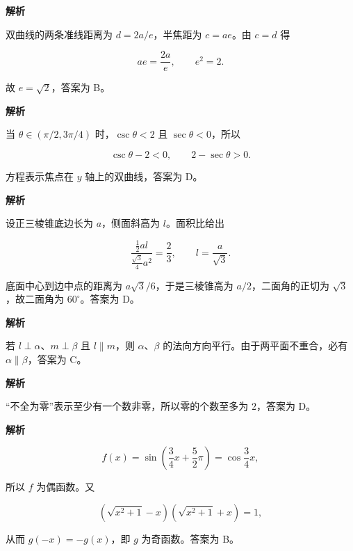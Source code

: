 \begin{answer}
\textbf{解析}

双曲线的两条准线距离为 $d=2a/e$，半焦距为 $c=ae$。由 $c=d$ 得

\nopagebreak[4]
\[
ae=\frac{2a}{e},
\qquad e^2=2.
\]

故 $e=\sqrt2$，答案为 B。


\textbf{解析}

当 $\theta\in(\pi/2,3\pi/4)$ 时，$\csc\theta<2$ 且 $\sec\theta<0$，所以

\nopagebreak[4]
\[
\csc\theta-2<0,\qquad 2-\sec\theta>0.
\]

方程表示焦点在 $y$ 轴上的双曲线，答案为 D。


\textbf{解析}

设正三棱锥底边长为 $a$，侧面斜高为 $l$。面积比给出

\nopagebreak[4]
\[
\frac{\frac12al}{\frac{\sqrt3}{4}a^2}=\frac23,
\qquad
l=\frac a{\sqrt3}.
\]

底面中心到边中点的距离为 $a\sqrt3/6$，于是三棱锥高为 $a/2$，二面角的正切为 $\sqrt3$，故二面角为 $60^\circ$。答案为 D。


\textbf{解析}

若 $l\perp\alpha$、$m\perp\beta$ 且 $l\parallel m$，则 $\alpha$、$\beta$ 的法向方向平行。由于两平面不重合，必有 $\alpha\parallel\beta$，答案为 C。


\textbf{解析}

“不全为零”表示至少有一个数非零，所以零的个数至多为 $2$，答案为 D。


\textbf{解析}

\nopagebreak[4]
\[
f(x)=\sin\left(\frac34x+\frac52\pi\right)
=\cos\frac34x,
\]

所以 $f$ 为偶函数。又

\nopagebreak[4]
\[
\left(\sqrt{x^2+1}-x\right)\left(\sqrt{x^2+1}+x\right)=1,
\]

从而 $g(-x)=-g(x)$，即 $g$ 为奇函数。答案为 B。



\end{answer}
